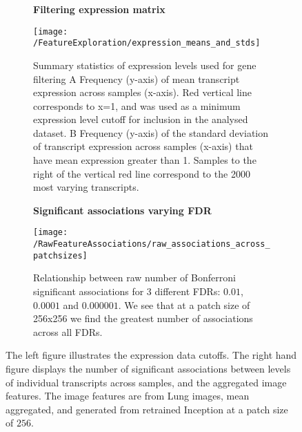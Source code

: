 \documentclass[graybox]{svmult}
\newcommand*{\figuretitle}[1]{%
    {\centering%
    \textbf{#1}%
    \par\medskip}%
}
\begin{document}
\begin{figure}[H]

\begin{subfigure}{0.45\textwidth}
\figuretitle{Filtering expression matrix}
\texttt{[image: /FeatureExploration/expression\_means\_and\_stds]}
\caption{Summary statistics of expression levels used for gene filtering \textcolor{ao(english)}{A} Frequency (y-axis) of mean transcript expression across samples (x-axis). Red vertical line corresponds to x=1, and was used as a minimum expression level cutoff for inclusion in the analysed dataset. \textcolor{ao(english)}{B} Frequency (y-axis) of the standard deviation of transcript expression across samples (x-axis) that have mean expression greater than 1. Samples to the right of the vertical red line correspond to the 2000 most varying transcripts.}
\label{fig:expression_means_and_stds}
\end{subfigure}
\hfill
\begin{subfigure}{0.45\textwidth}
\figuretitle{Significant associations varying FDR}
\texttt{[image: /RawFeatureAssociations/raw\_associations\_across\_patchsizes]}
\caption{Relationship between raw number of Bonferroni significant associations for 3 different FDRs: $0.01$, $0.0001$ and $0.000001$. We see that at a patch size of 256x256 we find the greatest number of associations across all FDRs.}
\label{fig:associations_raw_vs_retrained}
\end{subfigure}

\caption{The left figure illustrates the expression data cutoffs. The right hand figure displays the number of significant associations between levels of individual transcripts across samples, and the aggregated image features. The image features are from Lung images, mean aggregated, and generated from retrained Inception at a patch size of $256$.}
\label{fig:expression_cutoff_and_raw_significant_associations}
\end{figure}
\end{document}
